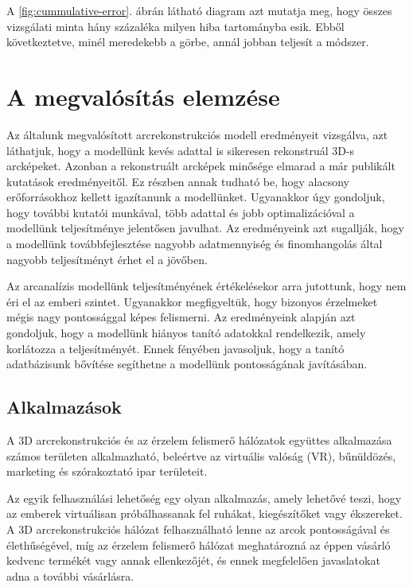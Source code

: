\documentclass[12pt,a4]{article}
\begin{document}
            A \ref{fig:cummulative-error}. ábrán látható diagram azt mutatja meg, hogy összes vizsgálati minta hány százaléka milyen hiba tartományba esik. Ebből következtetve, minél meredekebb a görbe, annál jobban teljesít a módszer.
    
    \section{A megvalósítás elemzése}

        Az általunk megvalósított arcrekonstrukciós modell eredményeit vizsgálva, azt láthatjuk, hogy a modellünk kevés adattal is sikeresen rekonstruál 3D-s arcképeket. Azonban a rekonstruált arcképek minősége elmarad a már publikált kutatások eredményeitől. Ez részben annak tudható be, hogy alacsony erőforrásokhoz kellett igazítanunk a modellünket. Ugyanakkor úgy gondoljuk, hogy további kutatói munkával, több adattal és jobb optimalizációval a modellünk teljesítménye jelentősen javulhat. Az eredményeink azt sugallják, hogy a modellünk továbbfejlesztése nagyobb adatmennyiség és finomhangolás által nagyobb teljesítményt érhet el a jövőben. 

        Az arcanalízis modellünk teljesítményének értékelésekor arra jutottunk, hogy nem éri el az emberi szintet. Ugyanakkor megfigyeltük, hogy bizonyos érzelmeket mégis nagy pontossággal képes felismerni. Az eredményeink alapján azt gondoljuk, hogy a modellünk hiányos tanító adatokkal rendelkezik, amely korlátozza a teljesítményét. Ennek fényében javasoljuk, hogy a tanító adatbázisunk bővítése segíthetne a modellünk pontosságának javításában.
    
        \subsection{Alkalmazások}

        A 3D arcrekonstrukciós és az érzelem felismerő hálózatok együttes alkalmazása számos területen alkalmazható, beleértve az virtuális valóság (VR), bűnüldözés, marketing és szórakoztató ipar területeit. 
        
        Az egyik felhasználási lehetőség egy olyan alkalmazás, amely lehetővé teszi, hogy az emberek virtuálisan próbálhassanak fel ruhákat, kiegészítőket vagy ékszereket. A 3D arcrekonstrukciós hálózat felhasználható lenne az arcok pontosságával és élethűségével, míg az érzelem felismerő hálózat meghatározná az éppen vásárló kedvenc termékét vagy annak ellenkezőjét, és ennek megfelelően javaslatokat adna a további vásárlásra.
\end{document}
